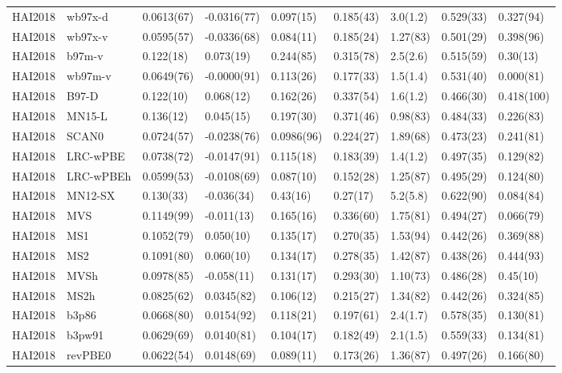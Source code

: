 \begin{table}[ht]
\begin{tabular}{lllllllll}
  HAI2018 & wb97x-d & 0.0613(67) & -0.0316(77) & 0.097(15) & 0.185(43) & 3.0(1.2) & 0.529(33) & 0.327(94) \\ 
  HAI2018 & wb97x-v & 0.0595(57) & -0.0336(68) & 0.084(11) & 0.185(24) & 1.27(83) & 0.501(29) & 0.398(96) \\ 
  HAI2018 & b97m-v & 0.122(18) & 0.073(19) & 0.244(85) & 0.315(78) & 2.5(2.6) & 0.515(59) & 0.30(13) \\ 
  HAI2018 & wb97m-v & 0.0649(76) & -0.0000(91) & 0.113(26) & 0.177(33) & 1.5(1.4) & 0.531(40) & 0.000(81) \\ 
  HAI2018 & B97-D & 0.122(10) & 0.068(12) & 0.162(26) & 0.337(54) & 1.6(1.2) & 0.466(30) & 0.418(100) \\ 
  HAI2018 & MN15-L & 0.136(12) & 0.045(15) & 0.197(30) & 0.371(46) & 0.98(83) & 0.484(33) & 0.226(83) \\ 
  HAI2018 & SCAN0 & 0.0724(57) & -0.0238(76) & 0.0986(96) & 0.224(27) & 1.89(68) & 0.473(23) & 0.241(81) \\ 
  HAI2018 & LRC-wPBE & 0.0738(72) & -0.0147(91) & 0.115(18) & 0.183(39) & 1.4(1.2) & 0.497(35) & 0.129(82) \\ 
  HAI2018 & LRC-wPBEh & 0.0599(53) & -0.0108(69) & 0.087(10) & 0.152(28) & 1.25(87) & 0.495(29) & 0.124(80) \\ 
  HAI2018 & MN12-SX & 0.130(33) & -0.036(34) & 0.43(16) & 0.27(17) & 5.2(5.8) & 0.622(90) & 0.084(84) \\ 
  HAI2018 & MVS & 0.1149(99) & -0.011(13) & 0.165(16) & 0.336(60) & 1.75(81) & 0.494(27) & 0.066(79) \\ 
  HAI2018 & MS1 & 0.1052(79) & 0.050(10) & 0.135(17) & 0.270(35) & 1.53(94) & 0.442(26) & 0.369(88) \\ 
  HAI2018 & MS2 & 0.1091(80) & 0.060(10) & 0.134(17) & 0.278(35) & 1.42(87) & 0.438(26) & 0.444(93) \\ 
  HAI2018 & MVSh & 0.0978(85) & -0.058(11) & 0.131(17) & 0.293(30) & 1.10(73) & 0.486(28) & 0.45(10) \\ 
  HAI2018 & MS2h & 0.0825(62) & 0.0345(82) & 0.106(12) & 0.215(27) & 1.34(82) & 0.442(26) & 0.324(85) \\ 
  HAI2018 & b3p86 & 0.0668(80) & 0.0154(92) & 0.118(21) & 0.197(61) & 2.4(1.7) & 0.578(35) & 0.130(81) \\ 
  HAI2018 & b3pw91 & 0.0629(69) & 0.0140(81) & 0.104(17) & 0.182(49) & 2.1(1.5) & 0.559(33) & 0.134(81) \\ 
  HAI2018 & revPBE0 & 0.0622(54) & 0.0148(69) & 0.089(11) & 0.173(26) & 1.36(87) & 0.497(26) & 0.166(80) \\ 

\end{tabular}
\end{table}

